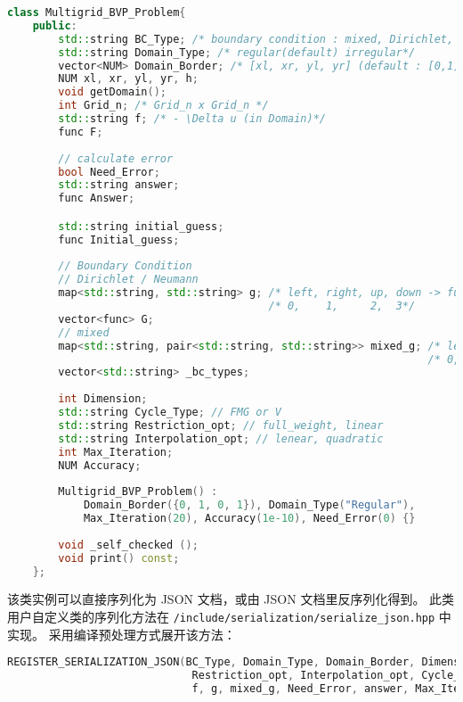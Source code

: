 \documentclass[lang=cn,a4paper,newtx,bibend=bibtex]{elegantpaper}
\begin{document}
\begin{lstlisting}[language = C++]
  class Multigrid_BVP_Problem{
    public:
        std::string BC_Type; /* boundary condition : mixed, Dirichlet, Neumann*/
        std::string Domain_Type; /* regular(default) irregular*/
        vector<NUM> Domain_Border; /* [xl, xr, yl, yr] (default : [0,1]x[0,1])*/
        NUM xl, xr, yl, yr, h;
        void getDomain();
        int Grid_n; /* Grid_n x Grid_n */
        std::string f; /* - \Delta u (in Domain)*/
        func F;
    
        // calculate error
        bool Need_Error;
        std::string answer;
        func Answer;

        std::string initial_guess;
        func Initial_guess;
    
        // Boundary Condition
        // Dirichlet / Neumann
        map<std::string, std::string> g; /* left, right, up, down -> function*/
                                         /* 0,    1,     2,  3*/
        vector<func> G;
        // mixed
        map<std::string, pair<std::string, std::string>> mixed_g; /* left, right, up, down -> function*/
                                                                  /* 0,    1,     2,  3 */
        vector<std::string> _bc_types;
    
        int Dimension;
        std::string Cycle_Type; // FMG or V
        std::string Restriction_opt; // full_weight, linear
        std::string Interpolation_opt; // lenear, quadratic
        int Max_Iteration;
        NUM Accuracy;
    
        Multigrid_BVP_Problem() : 
            Domain_Border({0, 1, 0, 1}), Domain_Type("Regular"), 
            Max_Iteration(20), Accuracy(1e-10), Need_Error(0) {}
      
        void _self_checked ();
        void print() const;
    };
\end{lstlisting}

该类实例可以直接序列化为 JSON 文档，或由 JSON 文档里反序列化得到。
此类用户自定义类的序列化方法在 \texttt{/include/serialization/serialize\_json.hpp} 中实现。
采用编译预处理方式展开该方法：

\begin{lstlisting}[language = C++]
REGISTER_SERIALIZATION_JSON(BC_Type, Domain_Type, Domain_Border, Dimension, 
                             Restriction_opt, Interpolation_opt, Cycle_Type, Grid_n, 
                             f, g, mixed_g, Need_Error, answer, Max_Iteration, Accuracy);
\end{lstlisting}
\end{document}
